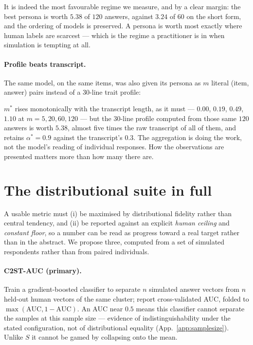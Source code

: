 \documentclass[11pt]{article}
\begin{document}
It is indeed the most favourable regime we measure, and by a clear margin: the
best persona is worth $\mathbf{5.38}$ of $120$ answers, against $3.24$ of $60$ on
the short form, and the ordering of models is preserved. A persona is worth most
exactly where human labels are scarcest --- which is the regime a practitioner is
in when simulation is tempting at all.

\paragraph{Profile beats transcript.} The same model, on the same items, was also
given its persona as $m$ literal (item, answer) pairs instead of a $30$-line trait
profile:

$m^{*}$ rises monotonically with the transcript length, as it must --- $0.00$,
$0.19$, $0.49$, $1.10$ at $m{=}5,20,60,120$ --- but the $30$-line profile computed
from those same $120$ answers is worth $\mathbf{5.38}$, almost five times the raw
transcript of all of them, and retains $\alpha^{*}{=}0.9$ against the
transcript's $0.3$. The aggregation is doing the work, not the model's reading of
individual responses. How the observations are presented matters more than how
many there are.

\section{The distributional suite in full}
\label{app:suite}


A usable metric must (i) be maximised by distributional fidelity rather than
central tendency, and (ii) be reported against an explicit \emph{human ceiling}
and \emph{constant floor}, so a number can be read as progress toward a real
target rather than in the abstract. We propose three, computed from a set of
simulated respondents rather than from paired individuals.

\paragraph{C2ST-AUC (primary).} Train a gradient-boosted classifier to separate
$n$ simulated answer vectors from $n$ held-out human vectors of the same
cluster; report cross-validated AUC, folded to $\max(\text{AUC},1-\text{AUC})$.
An AUC near $0.5$ means this classifier cannot separate the samples at this
sample size --- evidence of indistinguishability under the stated
configuration, not of distributional equality (App.~\ref{app:samplesize}).
Unlike $S$ it cannot be gamed by collapsing onto the mean.
\end{document}
